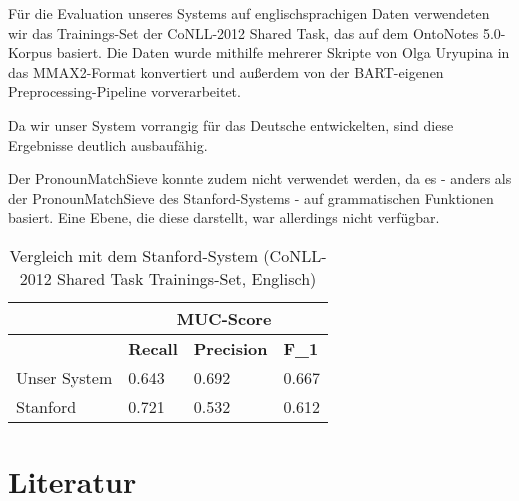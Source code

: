 \documentclass{scrartcl}
\begin{document}
Für die Evaluation unseres Systems auf englischsprachigen Daten verwendeten wir das Trainings-Set der CoNLL-2012 Shared Task, das auf dem OntoNotes 5.0-Korpus basiert. Die Daten wurde mithilfe mehrerer Skripte von Olga Uryupina in das MMAX2-Format konvertiert und außerdem von der BART-eigenen Preprocessing-Pipeline vorverarbeitet.

Da wir unser System vorrangig für das Deutsche entwickelten, sind diese Ergebnisse deutlich ausbaufähig.

Der PronounMatchSieve konnte zudem nicht verwendet werden, da es - anders als der PronounMatchSieve des Stanford-Systems - auf grammatischen Funktionen basiert. Eine Ebene, die diese darstellt, war allerdings nicht verfügbar. \\

\begin{table}[h]
\begin{tabular}{l||ll|l}
& \multicolumn{3}{c}{\textbf{MUC-Score}} \\ \hline
               & \textbf{Recall}		 & \textbf{Precision} & \textbf{F\_1}    \\ \hline
Unser System 	& 0.643      & 0.692              & 0.667  \\
Stanford  & 0.721 		 & 0.532     & 0.612
          
\end{tabular}
\caption{Vergleich mit dem Stanford-System (CoNLL- 2012 Shared Task Trainings-Set, Englisch)}
\label{tab:ml_vergleich}
\end{table}

\clearpage

\nocite{*}
\renewcommand*{\refname}{} %
\section{Literatur}  
{}

\end{document}
